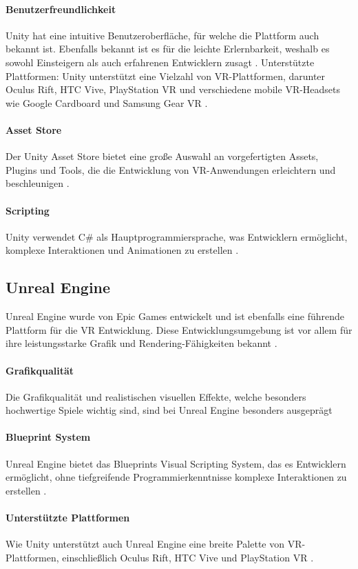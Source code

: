 \paragraph{Benutzerfreundlichkeit}
Unity hat eine intuitive Benutzeroberfläche, für welche die Plattform auch bekannt ist. Ebenfalls bekannt ist es für die leichte Erlernbarkeit, weshalb es sowohl Einsteigern als auch erfahrenen Entwicklern zusagt \cite{unity2021}.
Unterstützte Plattformen: Unity unterstützt eine Vielzahl von VR-Plattformen, darunter Oculus Rift, HTC Vive, PlayStation VR und verschiedene mobile VR-Headsets wie Google Cardboard und Samsung Gear VR \cite{unity2021}.
\paragraph{Asset Store}
Der Unity Asset Store bietet eine große Auswahl an vorgefertigten Assets, Plugins und Tools, die die Entwicklung von VR-Anwendungen erleichtern und beschleunigen \cite{unityAssetStore2021}.
\paragraph{Scripting}
Unity verwendet C\# als Hauptprogrammiersprache, was Entwicklern ermöglicht, komplexe Interaktionen und Animationen zu erstellen \cite{unity2021}.
\subsection{Unreal Engine}
Unreal Engine wurde von Epic Games entwickelt und ist ebenfalls eine führende Plattform für die VR Entwicklung. Diese Entwicklungsumgebung ist vor allem für ihre leistungsstarke Grafik und Rendering-Fähigkeiten bekannt .
\paragraph{Grafikqualität} Die Grafikqualität und realistischen visuellen Effekte, welche besonders hochwertige Spiele wichtig sind, sind bei Unreal Engine besonders ausgeprägt \cite{epic2021}
\paragraph{Blueprint System} Unreal Engine bietet das Blueprints Visual Scripting System, das es Entwicklern ermöglicht, ohne tiefgreifende Programmierkenntnisse komplexe Interaktionen zu erstellen \cite{epicBlueprints2021}.
\paragraph{Unterstützte Plattformen} Wie Unity unterstützt auch Unreal Engine eine breite Palette von VR-Plattformen, einschließlich Oculus Rift, HTC Vive und PlayStation VR \cite{epic2021}.
